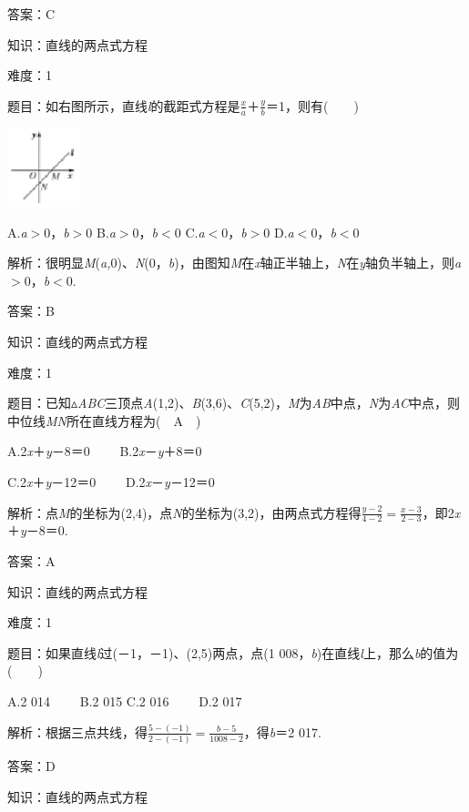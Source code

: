 \documentclass{article} %
\begin{document}
答案：C

知识：直线的两点式方程

难度：1

题目：如右图所示，直线\textit{l}的截距式方程是$\frac{x}{a}$＋$\frac{y}{b}$＝1，则有(　　)

\includegraphics*[width=0.83in, height=0.90in, keepaspectratio=false]{image280}

A.\textit{a}$\mathrm{>}$0，\textit{b}$\mathrm{>}$0 B.\textit{a}$\mathrm{>}$0，\textit{b}$\mathrm{<}$0 C.\textit{a}$\mathrm{<}$0，\textit{b}$\mathrm{>}$0 D.\textit{a}$\mathrm{<}$0，\textit{b}$\mathrm{<}$0

解析：很明显\textit{M}(\textit{a,}0)、\textit{N}(0，\textit{b})，由图知\textit{M}在\textit{x}轴正半轴上，\textit{N}在\textit{y}轴负半轴上，则\textit{a}$\mathrm{>}$0，\textit{b}$\mathrm{<}$0.

答案：B

知识：直线的两点式方程

难度：1

题目：已知$\mathrm{\vartriangle}$\textit{ABC}三顶点\textit{A}(1,2)、\textit{B}(3,6)、\textit{C}(5,2)，\textit{M}为\textit{AB}中点，\textit{N}为\textit{AC}中点，则中位线\textit{MN}所在直线方程为(　A　)

A.2\textit{x}＋\textit{y}－8＝0　　  B.2\textit{x}－\textit{y}＋8＝0 

C.2\textit{x}＋\textit{y}－12＝0　　  D.2\textit{x}－\textit{y}－12＝0

解析：点\textit{M}的坐标为(2,4)，点\textit{N}的坐标为(3,2)，由两点式方程得$\frac{y-2}{4-2}=\frac{x-3}{2-3}$，即2\textit{x}＋\textit{y}－8＝0.

答案：A

知识：直线的两点式方程

难度：1

题目：如果直线\textit{l}过(－1，－1)、(2,5)两点，点(1 008，\textit{b})在直线\textit{l}上，那么\textit{b}的值为(　　)

A.2 014　　 B.2 015 C.2 016　　 D.2 017

解析：根据三点共线，得$\frac{5-(-1)}{2-(-1)}=\frac{b-5}{1008-2}$，得\textit{b}＝2 017.

答案：D

知识：直线的两点式方程
\end{document}
